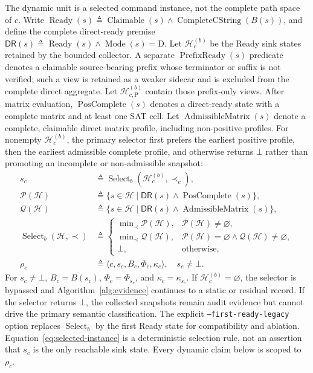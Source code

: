The dynamic unit is a selected command instance, not the complete path space of
$c$. Write $\operatorname{Ready}(s)\triangleq\operatorname{Claimable}(s)\land
\operatorname{CompleteCString}(B(s))$, and define the complete direct-ready premise
$\mathsf{DR}(s)\triangleq\operatorname{Ready}(s)\land
\operatorname{Mode}(s)=\mathrm D$. Let $\mathcal H_c^{(b)}$ be the Ready
sink states retained by the bounded collector. A separate
$\operatorname{PrefixReady}(s)$ predicate denotes a claimable source-bearing
prefix whose terminator or suffix is not verified; such a view is retained as
a weaker sidecar and is excluded from the complete direct aggregate. Let
$\mathcal H_{c,\mathrm P}^{(b)}$ contain those prefix-only views. After matrix evaluation,
$\operatorname{PosComplete}(s)$ denotes a direct-ready state with a complete
matrix and at least one SAT cell. Let
$\operatorname{AdmissibleMatrix}(s)$ denote a complete, claimable direct
matrix profile, including non-positive profiles. For nonempty
$\mathcal H_c^{(b)}$, the primary selector first prefers the earliest positive
profile, then the earliest admissible complete profile, and otherwise returns
$\bot$ rather than promoting an incomplete or non-admissible snapshot:
\begin{equation}
\begin{aligned}
 s_c&\triangleq\operatorname{Select}_b(\mathcal H_c^{(b)},\prec_c),\\[-1mm]
 \mathcal P(\mathcal H)&\triangleq
   \{s\in\mathcal H\mid\mathsf{DR}(s)\land\operatorname{PosComplete}(s)\},\\[-1mm]
 \mathcal Q(\mathcal H)&\triangleq
   \{s\in\mathcal H\mid\mathsf{DR}(s)\land\operatorname{AdmissibleMatrix}(s)\},\\[-1mm]
 \operatorname{Select}_b(\mathcal H,\prec)&\triangleq
 \begin{cases}
 \min\nolimits_{\prec}\mathcal P(\mathcal H),
   &\mathcal P(\mathcal H)\neq\varnothing,\\[-1mm]
 \min\nolimits_{\prec}\mathcal Q(\mathcal H),
   &\mathcal P(\mathcal H)=\varnothing\land
    \mathcal Q(\mathcal H)\neq\varnothing,\\[-1mm]
 \bot, &\text{otherwise},
 \end{cases}\\[-1mm]
\rho_c&\triangleq\langle c,s_c,B_c,\Phi_c,\kappa_c\rangle,
  \quad s_c\neq\bot.
\end{aligned}
\label{eq:selected-instance}
\end{equation}
For $s_c\neq\bot$, $B_c=B(s_c)$, $\Phi_c=\Phi_{s_c}$, and $\kappa_c=\kappa_{s_c}$. If
$\mathcal H_c^{(b)}=\varnothing$, the selector is bypassed and Algorithm~\ref{alg:evidence}
continues to a static or residual record. If the selector returns $\bot$,
the collected snapshots remain audit evidence but cannot drive the primary
semantic classification. The explicit
\texttt{--first-ready-legacy} option replaces $\operatorname{Select}_b$ by the
first Ready state for compatibility and ablation. Equation~\ref{eq:selected-instance}
is a deterministic selection rule, not an assertion that $s_c$ is the only
reachable sink state. Every dynamic claim below is scoped to $\rho_c$.

